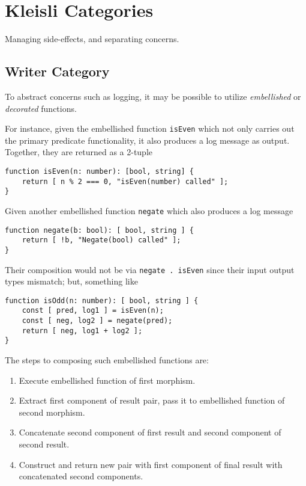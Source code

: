 \section{Kleisli Categories}

Managing side-effects, and separating concerns.

\subsection{Writer Category}

\begin{example}
    To abstract concerns such as logging, it may be possible to utilize \textit{embellished} or \textit{decorated} functions.
    
    For instance, given the embellished function \texttt{isEven} which not only carries out the primary predicate functionality, it also produces a log message as output. Together, they are returned as a 2-tuple
    \begin{verbatim}
function isEven(n: number): [bool, string] {
    return [ n % 2 === 0, "isEven(number) called" ];
}
    \end{verbatim}
    
    Given another embellished function \texttt{negate} which also produces a log message
    \begin{verbatim}
function negate(b: bool): [ bool, string ] {
    return [ !b, "Negate(bool) called" ];
}
    \end{verbatim}
    
    Their composition would not be via \texttt{negate . isEven} since their input output types mismatch; but, something like
    \begin{verbatim}
function isOdd(n: number): [ bool, string ] {
    const [ pred, log1 ] = isEven(n);
    const [ neg, log2 ] = negate(pred);
    return [ neg, log1 + log2 ];
}
    \end{verbatim}
\end{example}

\begin{definition}
    The steps to composing such embellished functions are:
    \begin{enumerate}
        \item Execute embellished function of first morphism.
        \item Extract first component of result pair, pass it to embellished function of second morphism.
        \item Concatenate second component of first result and second component of second result.
        \item Construct and return new pair with first component of final result with concatenated second components.
    \end{enumerate}
\end{definition}

